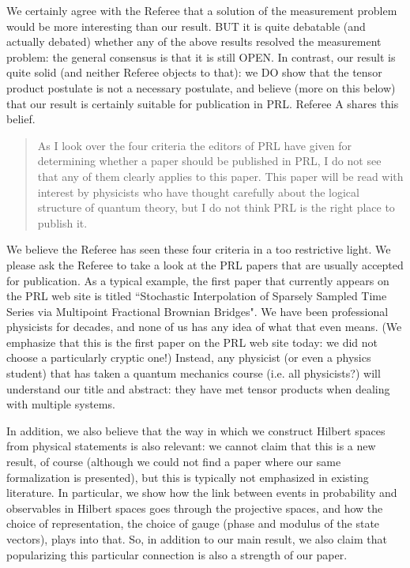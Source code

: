 \documentclass[11pt]{article}
\begin{document}
We certainly agree with the Referee that a solution of the measurement
problem would be more interesting than our result. BUT it is quite
debatable (and actually debated) whether any of the above results
resolved the measurement problem: the general consensus is that it is
still OPEN. In contrast, our result is quite solid (and neither
Referee objects to that): we DO show that the tensor product postulate
is not a necessary postulate, and believe (more on this below) that
our result is certainly suitable for publication in PRL. Referee A
shares this belief.

\begin{quote}
As I look over the four criteria the editors of PRL have
given for determining whether a paper should be published in PRL, I do
not see that any of them clearly applies to this paper. This paper
will be read with interest by physicists who have thought carefully
about the logical structure of quantum theory, but I do not think PRL
is the right place to publish it.
\end{quote}

We believe the Referee has seen these four criteria in a too
restrictive light. We please ask the Referee to take a look at the PRL
papers that are usually accepted for publication. As a typical
example, the first paper that currently appears on the PRL web site is
titled ``Stochastic Interpolation of Sparsely Sampled Time Series via
Multipoint Fractional Brownian Bridges". We have been professional
physicists for decades, and none of us has any idea of what that even
means. (We emphasize that this is the first paper on the PRL web site
today: we did not choose a particularly cryptic one!) Instead, any
physicist (or even a physics student) that has taken a quantum
mechanics course (i.e. all physicists?) will understand our title and
abstract: they have met tensor products when dealing with multiple
systems.

In addition, we also believe that the way in which we construct
Hilbert spaces from physical statements is also relevant: we cannot
claim that this is a new result, of course (although we could not find
a paper where our same formalization is presented), but this is
typically not emphasized in existing literature. In particular, we
show how the link between events in probability and observables in
Hilbert spaces goes through the projective spaces, and how the choice
of representation, the choice of gauge (phase and modulus of the state
vectors), plays into that. So, in addition to our main result, we also
claim that popularizing this particular connection is also a strength
of our paper.
\end{document}
